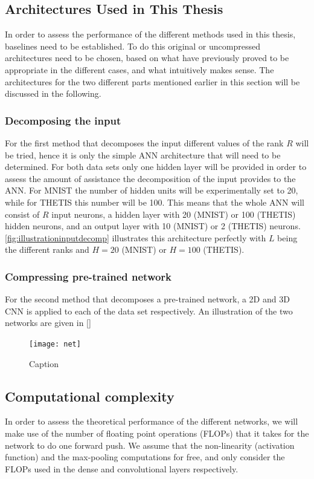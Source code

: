 \subsection{Architectures Used in This Thesis}
In order to assess the performance of the different methods used in this thesis, baselines need to be established. To do this original or uncompressed architectures need to be chosen, based on what have previously proved to be appropriate in the different cases, and what intuitively makes sense. The architectures for the two different parts mentioned earlier in this section will be discussed in the following.

\subsubsection{Decomposing the input}
For the first method that decomposes the input different values of the rank $R$ will be tried, hence it is only the simple ANN architecture that will need to be determined. For both data sets only one hidden layer will be provided in order to assess the amount of assistance the decomposition of the input provides to the ANN. For MNIST the number of hidden units will be experimentally set to 20, while for THETIS this number will be 100. This means that the whole ANN will consist of $R$ input neurons, a hidden layer with 20 (MNIST) or 100 (THETIS) hidden neurons, and an output layer with 10 (MNIST) or 2 (THETIS) neurons. \autoref{fig:illustrationinputdecomp} illustrates this architecture perfectly with $L$ being the different ranks and $H = 20$ (MNIST) or $H=100$ (THETIS).

\subsubsection{Compressing pre-trained network}
For the second method that decomposes a pre-trained network, a 2D and 3D CNN is applied to each of the data set respectively. An illustration of the two networks are given in \autoref{}
\begin{figure}
    \centering
    \texttt{[image: net]}
    \caption{Caption}
    \label{fig:my_label}
\end{figure}

\subsection{Computational complexity}\label{tex:computational_complexity}
In order to assess the theoretical performance of the different networks, we will make use of the number of floating point operations (FLOPs) that it takes for the network to do one forward push. We assume that the non-linearity (activation function) and the max-pooling computations for free, and only consider the FLOPs used in the dense and convolutional layers respectively.

